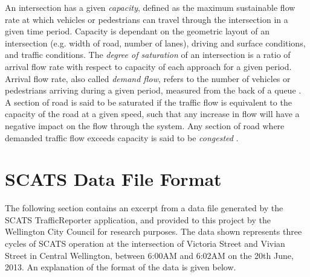 \begin{appendices}
An intersection has a given \emph{capacity}, defined as the maximum sustainable flow rate at which vehicles or pedestrians can travel through the intersection in a given time period. Capacity is dependant on the geometric layout of an intersection (e.g. width of road, number of lanes), driving and surface conditions, and traffic conditions. The \emph{degree of saturation} of an intersection is a ratio of arrival flow rate with respect to capacity of each approach for a given period. Arrival flow rate, also called \emph{demand flow}, refers to the number of vehicles or pedestrians arriving during a given period, measured from the back of a queue \cite{sidraglossary}. A section of road is said to be saturated if the traffic flow is equivalent to the capacity of the road at a given speed, such that any increase in flow will have a negative impact on the flow through the system. Any section of road where demanded traffic flow exceeds capacity is said to be \emph{congested} \cite{wallis2013costs}.


\chapter{SCATS Data File Format}

The following section contains an excerpt from a data file generated by the SCATS TrafficReporter application, and provided to this project by the Wellington City Council for research purposes. The data shown represents three cycles of SCATS operation at the intersection of Victoria Street and Vivian Street in Central Wellington, between 6:00AM and 6:02AM on the 20th June, 2013. An explanation of the format of the data is given below.


\end{appendices}

